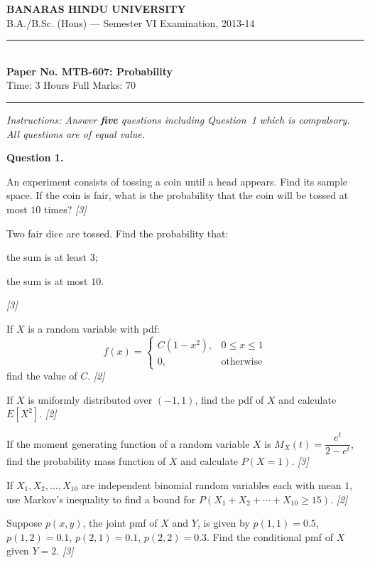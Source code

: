\documentclass[11pt,a4paper]{article}
\newcommand{\pts}[1]{\hfill   \textit{[#1]}}
\begin{document}
\begin{center}
  {\large\bfseries BANARAS HINDU UNIVERSITY}\\[2pt]
  {\normalsize B.A./B.Sc. (Hons) --- Semester VI Examination, 2013-14}\\[6pt]
  \rule{0.8\linewidth}{0.5pt}\\[6pt]
  {\large\bfseries Paper No. MTB-607: Probability}\\[4pt]
  {\normalsize Time: 3 Hours \hfill Full Marks: 70}
\end{center}
\rule{\linewidth}{0.4pt}
\smallskip



\noindent   \textit{Instructions: Answer   \textbf{five} questions including Question~1 which is compulsory. All questions are of equal value.}
\bigskip




\noindent   \textbf{Question 1.}

\begin{parts}
  \item An experiment consists of tossing a coin until a head appears. Find its sample space. If the coin is fair, what is the probability that the coin will be tossed at most $10$ times? \pts{3}
  \item Two fair dice are tossed. Find the probability that:
  
\begin{parts}
    \item the sum is at least $3$;
    \item the sum is at most $10$.
  \end{parts} \pts{3}
  \item If $X$ is a random variable with pdf:
  \[
  f(x) = 
\begin{cases} C(1 - x^2), & 0 \le x \le 1 \\ 0, &  \text{otherwise} \end{cases}
  \]
  find the value of $C$. \pts{2}
  \item If $X$ is uniformly distributed over $(-1, 1)$, find the pdf of $X$ and calculate $E[X^2]$. \pts{2}
  \item If the moment generating function of a random variable $X$ is $M_X(t) = \dfrac{e^t}{2 - e^t}$, find the probability mass function of $X$ and calculate $P(X = 1)$. \pts{3}
  \item If $X_1, X_2, \dots, X_{10}$ are independent binomial random variables each with mean $1$, use Markov's inequality to find a bound for $P(X_1 + X_2 + \cdots + X_{10} \ge 15)$. \pts{2}
  \item Suppose $p(x, y)$, the joint pmf of $X$ and $Y$, is given by $p(1,1) = 0.5$, $p(1,2) = 0.1$, $p(2,1) = 0.1$, $p(2,2) = 0.3$. Find the conditional pmf of $X$ given $Y = 2$. \pts{3}
\end{parts}
\end{document}
